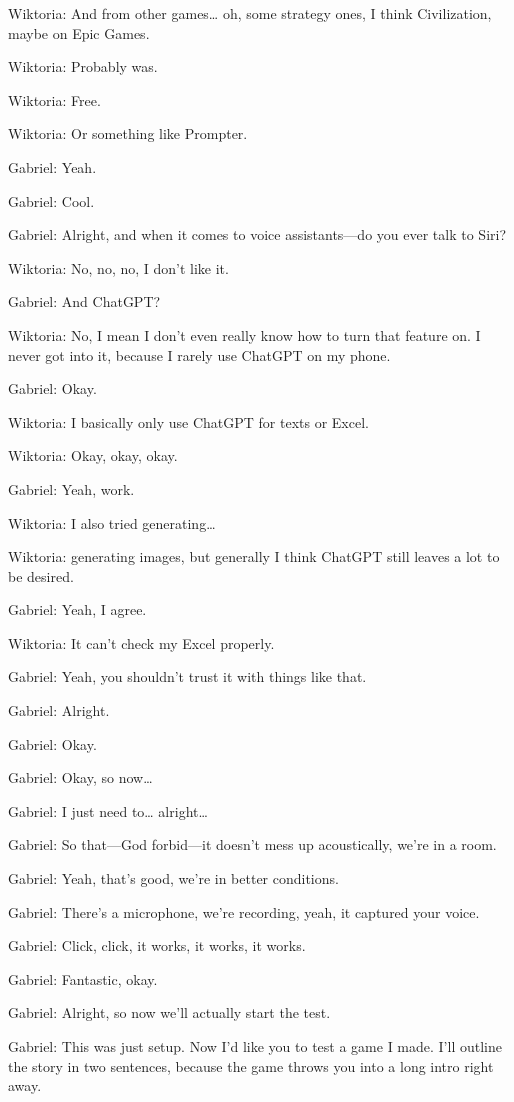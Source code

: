Wiktoria: And from other games… oh, some strategy ones, I think Civilization, maybe on Epic Games.

Wiktoria: Probably was.

Wiktoria: Free.

Wiktoria: Or something like Prompter.

Gabriel: Yeah.

Gabriel: Cool.

Gabriel: Alright, and when it comes to voice assistants—do you ever talk to Siri?

Wiktoria: No, no, no, I don’t like it.

Gabriel: And ChatGPT?

Wiktoria: No, I mean I don’t even really know how to turn that feature on. I never got into it, because I rarely use ChatGPT on my phone.

Gabriel: Okay.

Wiktoria: I basically only use ChatGPT for texts or Excel.

Wiktoria: Okay, okay, okay.

Gabriel: Yeah, work.

Wiktoria: I also tried generating…

Wiktoria: generating images, but generally I think ChatGPT still leaves a lot to be desired.

Gabriel: Yeah, I agree.

Wiktoria: It can’t check my Excel properly.

Gabriel: Yeah, you shouldn’t trust it with things like that.

Gabriel: Alright.

Gabriel: Okay.

Gabriel: Okay, so now…

Gabriel: I just need to… alright…

Gabriel: So that—God forbid—it doesn’t mess up acoustically, we’re in a room.

Gabriel: Yeah, that’s good, we’re in better conditions.

Gabriel: There’s a microphone, we’re recording, yeah, it captured your voice.

Gabriel: Click, click, it works, it works, it works.

Gabriel: Fantastic, okay.

Gabriel: Alright, so now we’ll actually start the test.

Gabriel: This was just setup. Now I’d like you to test a game I made. I’ll outline the story in two sentences, because the game throws you into a long intro right away.

